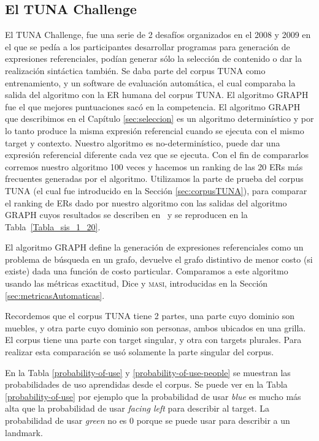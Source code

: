 \subsection{El TUNA Challenge}
El TUNA Challenge, fue una serie de 2 desaf\'ios organizados en el 2008 y 2009 en el que se ped\'ia a los participantes desarrollar programas para generaci\'on de expresiones referenciales, pod\'ian generar s\'olo la selecci\'on de contenido o dar la realizaci\'on sint\'actica tambi\'en.
Se daba parte del corpus TUNA como entrenamiento, y un software de evaluaci\'on autom\'atica, el cual comparaba la salida del algoritmo con la ER humana del corpus TUNA. El algoritmo GRAPH fue el que mejores puntuaciones sac\'o en la competencia.
El algoritmo GRAPH que describimos en el Cap\'itulo \ref{sec:seleccion} es un algoritmo determin\'istico y por lo tanto produce la misma expresi\'on referencial cuando se ejecuta con el mismo target y contexto. Nuestro algoritmo es no-determin\'istico, puede dar una expresi\'on referencial diferente cada vez que se ejecuta. Con el fin de compararlos corremos nuestro algoritmo 100 veces y hacemos un ranking de las 20 ERs m\'as frecuentes generadas por el algoritmo. Utilizamos la parte de prueba del corpus TUNA (el cual fue introducido en la Secci\'on \ref{sec:corpusTUNA}), para comparar el ranking de ERs dado por nuestro algoritmo con las salidas del algoritmo GRAPH cuyos resultados se describen en~\cite{KrahmerGRAPH} y se reproducen en la Tabla~\ref{Tabla_sis_1_20}.


El algoritmo GRAPH define la generaci\'on de expresiones referenciales como un problema de b\'usqueda en un grafo, devuelve el grafo distintivo de menor costo (si existe) dada una funci\'on de costo particular. Comparamos a este algoritmo usando las m\'etricas exactitud, Dice y \textsc {masi}, introducidas en la Secci\'on \ref{sec:metricasAutomaticas}. 

Recordemos que el corpus TUNA tiene 2 partes, una parte cuyo dominio son muebles, y otra parte cuyo dominio son personas, ambos ubicados en una grilla. El corpus tiene una parte con target singular, y otra con targets plurales. Para realizar esta comparaci\'on se us\'o solamente la parte singular del corpus.


En la Tabla \ref{probability-of-use} y \ref{probability-of-use-people} se muestran las probabilidades de uso aprendidas desde el corpus. Se puede ver en la Tabla \ref{probability-of-use} por ejemplo que la probabilidad de usar {\it blue} es mucho m\'as alta que la probabilidad de usar {\it facing left} para describir al target. La probabilidad de usar {\it green} no es 0 porque se puede usar para describir a un landmark.

